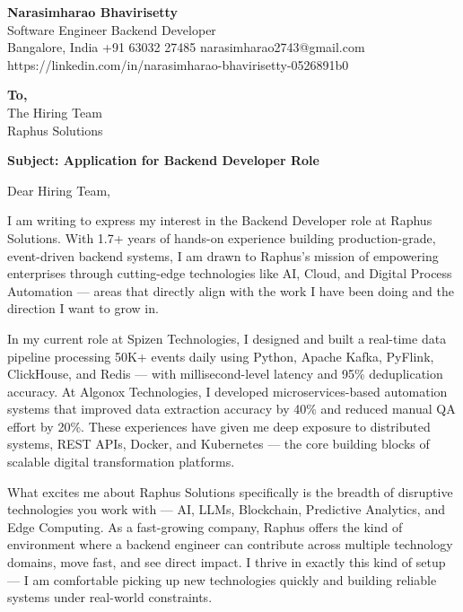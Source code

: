 \documentclass[10pt]{article}
\begin{document}
\begin{flushleft}
{\Large\textbf{Narasimharao Bhavirisetty}}\\[3pt]
Software Engineer \textbar{} Backend Developer\\[3pt]
Bangalore, India \textbullet{} +91 63032 27485 \textbullet{} narasimharao2743@gmail.com\\
https://linkedin.com/in/narasimharao-bhavirisetty-0526891b0
\end{flushleft}

\vspace{12pt}

\begin{flushleft}
\textbf{To,}\\
The Hiring Team\\
Raphus Solutions\\
\end{flushleft}

\vspace{8pt}

\textbf{Subject: Application for Backend Developer Role}

\vspace{10pt}

Dear Hiring Team,

I am writing to express my interest in the Backend Developer role at Raphus Solutions. With 1.7+ years of hands-on experience building production-grade, event-driven backend systems, I am drawn to Raphus's mission of empowering enterprises through cutting-edge technologies like AI, Cloud, and Digital Process Automation --- areas that directly align with the work I have been doing and the direction I want to grow in.

In my current role at Spizen Technologies, I designed and built a real-time data pipeline processing 50K+ events daily using Python, Apache Kafka, PyFlink, ClickHouse, and Redis --- with millisecond-level latency and 95\% deduplication accuracy. At Algonox Technologies, I developed microservices-based automation systems that improved data extraction accuracy by 40\% and reduced manual QA effort by 20\%. These experiences have given me deep exposure to distributed systems, REST APIs, Docker, and Kubernetes --- the core building blocks of scalable digital transformation platforms.

What excites me about Raphus Solutions specifically is the breadth of disruptive technologies you work with --- AI, LLMs, Blockchain, Predictive Analytics, and Edge Computing. As a fast-growing company, Raphus offers the kind of environment where a backend engineer can contribute across multiple technology domains, move fast, and see direct impact. I thrive in exactly this kind of setup --- I am comfortable picking up new technologies quickly and building reliable systems under real-world constraints.
\end{document}
